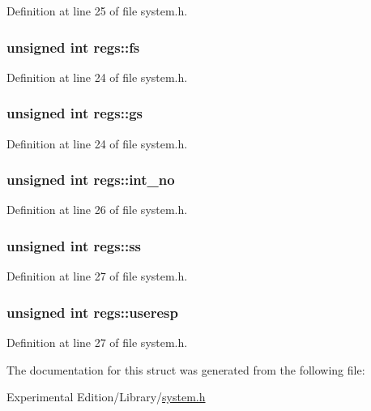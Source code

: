 Definition at line 25 of file system.\+h.

\subsubsection[{\texorpdfstring{fs}{fs}}]{\setlength{\rightskip}{0pt plus 5cm}unsigned int regs\+::fs}\hypertarget{structregs_a0a3292601916fad9c8e8463d5466652d}{}\label{structregs_a0a3292601916fad9c8e8463d5466652d}


Definition at line 24 of file system.\+h.

\subsubsection[{\texorpdfstring{gs}{gs}}]{\setlength{\rightskip}{0pt plus 5cm}unsigned int regs\+::gs}\hypertarget{structregs_a65174883574b177d940de50d85d000ea}{}\label{structregs_a65174883574b177d940de50d85d000ea}


Definition at line 24 of file system.\+h.

\subsubsection[{\texorpdfstring{int\+\_\+no}{int_no}}]{\setlength{\rightskip}{0pt plus 5cm}unsigned int regs\+::int\+\_\+no}\hypertarget{structregs_a0447d192cd01c7958fc5e06746c345d9}{}\label{structregs_a0447d192cd01c7958fc5e06746c345d9}


Definition at line 26 of file system.\+h.

\subsubsection[{\texorpdfstring{ss}{ss}}]{\setlength{\rightskip}{0pt plus 5cm}unsigned int regs\+::ss}\hypertarget{structregs_ae24c40e9efb433989445bfd318564c90}{}\label{structregs_ae24c40e9efb433989445bfd318564c90}


Definition at line 27 of file system.\+h.

\subsubsection[{\texorpdfstring{useresp}{useresp}}]{\setlength{\rightskip}{0pt plus 5cm}unsigned int regs\+::useresp}\hypertarget{structregs_a55d3b6b0025dd401f204d585d256c140}{}\label{structregs_a55d3b6b0025dd401f204d585d256c140}


Definition at line 27 of file system.\+h.



The documentation for this struct was generated from the following file\+:\begin{DoxyCompactItemize}
\item 
Experimental Edition/\+Library/\hyperlink{system_8h}{system.\+h}\end{DoxyCompactItemize}
